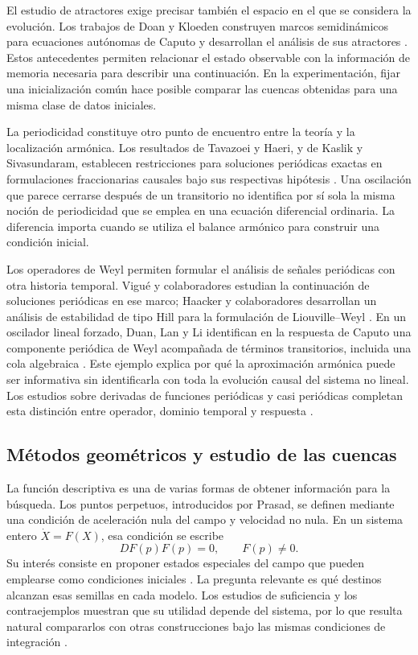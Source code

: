El estudio de atractores exige precisar también el espacio en el que se
considera la evolución. Los trabajos de Doan y Kloeden construyen marcos
semidinámicos para ecuaciones autónomas de Caputo y desarrollan el análisis
de sus atractores \cite{DoanKloeden2021Semidynamical,DoanKloeden2024Attractors}.
Estos antecedentes permiten relacionar el estado observable con la
información de memoria necesaria para describir una continuación. En la
experimentación, fijar una inicialización común hace posible comparar las
cuencas obtenidas para una misma clase de datos iniciales.

La periodicidad constituye otro punto de encuentro entre la teoría y la
localización armónica. Los resultados de Tavazoei y Haeri, y de Kaslik y
Sivasundaram, establecen restricciones para soluciones periódicas exactas
en formulaciones fraccionarias causales bajo sus respectivas hipótesis
\cite{TavazoeiHaeri2009,KaslikSivasundaram2012}. Una oscilación que parece
cerrarse después de un transitorio no identifica por sí sola la misma
noción de periodicidad que se emplea en una ecuación diferencial ordinaria.
La diferencia importa cuando se utiliza el balance armónico para construir
una condición inicial.

Los operadores de Weyl permiten formular el análisis de señales periódicas
con otra historia temporal. Vigué y colaboradores estudian la continuación
de soluciones periódicas en ese marco; Haacker y colaboradores desarrollan
un análisis de estabilidad de tipo Hill para la formulación de
Liouville--Weyl \cite{Vigue2019,Haacker2026}. En un oscilador lineal forzado,
Duan, Lan y Li identifican en la respuesta de Caputo una componente
periódica de Weyl acompañada de términos transitorios, incluida una cola
algebraica \cite{DuanLanLi2022WeylCaputo}. Este ejemplo explica por qué la
aproximación armónica puede ser informativa sin identificarla con toda la
evolución causal del sistema no lineal. Los estudios sobre derivadas de
funciones periódicas y casi periódicas completan esta distinción entre
operador, dominio temporal y respuesta
\cite{OrtigueiraMachadoTrujillo2017Periodic,ZhuLi2026PeriodicAlmostPeriodic}.

\subsection{Métodos geométricos y estudio de las cuencas}

La función descriptiva es una de varias formas de obtener información para
la búsqueda. Los puntos perpetuos, introducidos por Prasad, se definen
mediante una condición de aceleración nula del campo y velocidad no nula.
En un sistema entero \(\dot X=F(X)\), esa condición se escribe
\[
DF(p)F(p)=0,\qquad F(p)\neq0.
\]
Su interés consiste en proponer estados especiales del campo que pueden
emplearse como condiciones iniciales
\cite{Prasad2015Perpetual,DudkowskiPrasadKapitaniak2015,DudkowskiPrasadKapitaniak2017}.
La pregunta relevante es qué destinos alcanzan esas semillas en cada
modelo. Los estudios de suficiencia y los contraejemplos muestran que
su utilidad depende del sistema, por lo que resulta natural compararlos
con otras construcciones bajo las mismas condiciones de integración
\cite{NazarimehrSaediJafari2017}.


